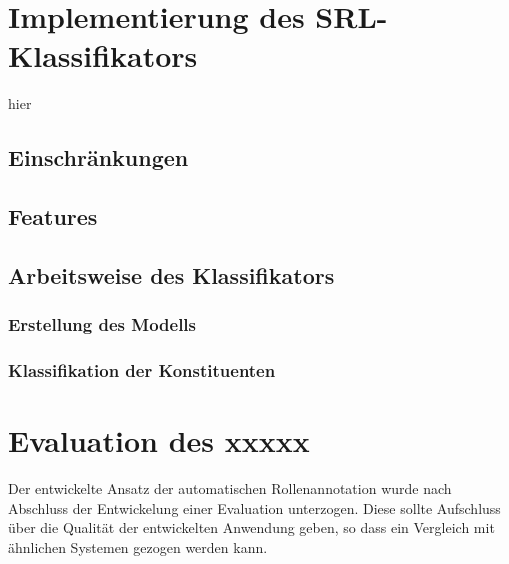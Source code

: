 \documentclass[12pt]{article}
\begin{document}
\section{Implementierung des SRL-Klassifikators}
hier
\subsection{Einschränkungen}
\subsection{Features}
\subsection{Arbeitsweise des Klassifikators}
\subsubsection{Erstellung des Modells}
\subsubsection{Klassifikation der Konstituenten}
\section{Evaluation des xxxxx} %

Der entwickelte Ansatz der automatischen Rollenannotation wurde nach Abschluss
der Entwickelung einer Evaluation unterzogen. Diese sollte Aufschluss über die
Qualität der entwickelten Anwendung geben, so dass ein Vergleich mit ähnlichen
Systemen gezogen werden kann.

\newpage


\end{document}
